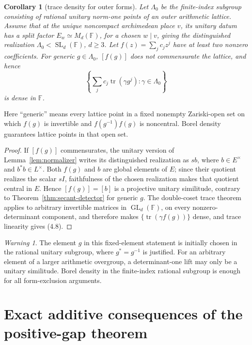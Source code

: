 \documentclass[11pt,reqno]{amsart}
\newtheorem{corollary}[theorem]{Corollary}
\theoremstyle{definition}
\theoremstyle{remark}
\newtheorem{warning}[theorem]{Warning}
\newcommand{\F}{\mathbb F}
\newcommand{\Tr}{\operatorname{tr}}
\newcommand{\SL}{\operatorname{SL}}
\newcommand{\GL}{\operatorname{GL}}
\begin{document}
\begin{corollary}[trace density for outer forms]\label{cor:outer-witness}
Let \(\Lambda_0\) be the finite-index subgroup consisting of rational
unitary norm-one points of an outer arithmetic lattice.  Assume that at the
unique noncompact archimedean place \(v\), its unitary datum has a split
factor \(E_w\simeq M_d(\F)\), for a chosen \(w\mid v\), giving the
distinguished realization \(\Lambda_0<\SL_d(\F)\), \(d\ge3\).
Let \(f(z)=\sum_jc_jz^j\) have at least two nonzero coefficients.  For generic
\(g\in\Lambda_0\), \([f(g)]\) does not commensurate the lattice, and hence
\[
 \left\{\sum_jc_j\Tr(\gamma g^j):\gamma\in\Lambda_0\right\}
\tag{4.8}
\]
is dense in \(\F\).
\end{corollary}

Here ``generic'' means every lattice point in a fixed nonempty Zariski-open
set on which \(f(g)\) is invertible and
\(f(g^{-1})f(g)\) is noncentral.  Borel density
\cite{BorelDensity} guarantees lattice points in that open set.

\begin{proof}
If \([f(g)]\) commensurates, the unitary version of
Lemma~\ref{lem:normalizer} writes its distinguished realization as \(s b\),
where \(b\in E^\times\) and \(b^*b\in L^\times\).  Both \(f(g)\) and \(b\)
are global elements of \(E\); since their quotient realizes the scalar
\(sI\), faithfulness of the chosen realization makes that quotient central
in \(E\).  Hence \([f(g)]=[b]\) is a projective unitary similitude, contrary
to Theorem~\ref{thm:secant-detector} for generic \(g\).  The double-coset
trace theorem~\cite{Bogachev} applies to arbitrary invertible matrices in
\(\GL_d(\F)\), on every nonzero-determinant component, and therefore makes
\(\{\Tr(\gamma f(g))\}\) dense, and trace linearity gives (4.8).
\end{proof}

\begin{warning}
The element \(g\) in this fixed-element statement is initially chosen in the
rational unitary subgroup, where \(g^*=g^{-1}\) is justified.  For an arbitrary
element of a larger arithmetic overgroup, a determinant-one lift may only be a
unitary similitude.  Borel density in the finite-index rational subgroup is
enough for all form-exclusion arguments.
\end{warning}

\section{Exact additive consequences of the positive-gap theorem}
\end{document}
